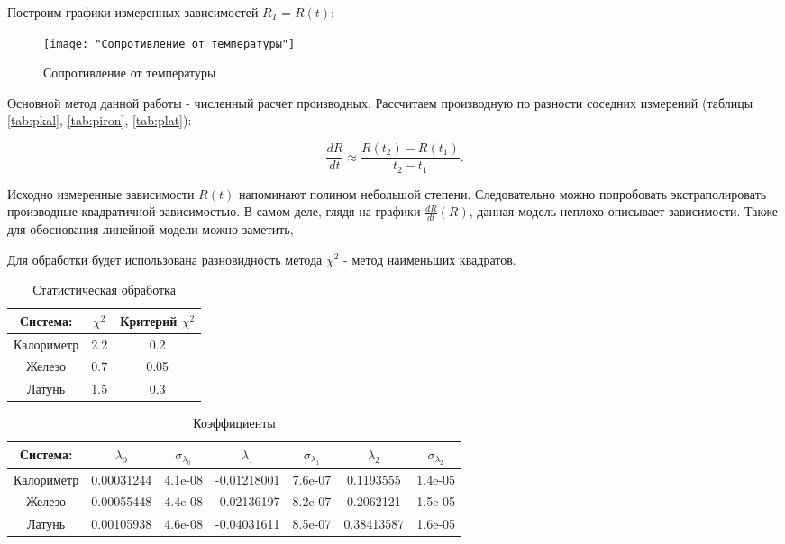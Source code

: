 \documentclass[12pt,a4paper]{article}
\begin{document}
Построим графики измеренных зависимостей $R_T = R(t)$:  
\begin{figure}
	\centering
	\texttt{[image: "Сопротивление от температуры"]}
	\caption{Сопротивление от температуры}
	\label{fig:RotT}
\end{figure}


Основной метод данной работы - численный расчет производных. Рассчитаем производную по разности соседних измерений (таблицы \ref{tab:pkal}, \ref{tab:piron}, \ref{tab:plat}):

$$\frac{dR}{dt} \approx \frac{R(t_2) - R(t_1)}{t_2-t_1}.$$

Исходно измеренные зависимости $R(t)$ напоминают полином небольшой степени. Следовательно можно попробовать экстраполировать производные квадратичной зависимостью. В самом деле, глядя на графики $\frac{dR}{dt}(R)$, данная модель неплохо описывает зависимости.
Также для обоснования линейной модели можно заметить, 

Для обработки будет использована разновидность метода $\chi^2$ - метод наименьших квадратов.


 
\begin{table}
	\centering
	\caption{Статистическая обработка}
	\label{tab:stat}
	\footnotesize
	\begin{tabular}{|c|c|c|}
		
		\hline
		Система: & $\chi^2$ & Критерий $\chi^2$ \\ \hline
		Калориметр & 2.2 & 0.2  \\ \hline
		Железо 	   & 0.7 & 0.05  \\ \hline
		Латунь 	   & 1.5 & 0.3   \\ \hline
		
	\end{tabular}
	
\end{table} 

\begin{table}
	\centering
	\caption{Коэффициенты}
	\label{tab:coeff}
	\footnotesize
	\begin{tabular}{|c|c|c|c|c|c|c|}
		
		\hline
		Система: & $\lambda_0$ & $\sigma_{\lambda_0}$ &$\lambda_1$ & $\sigma_{\lambda_1}$ &$\lambda_2$ & $\sigma_{\lambda_2}$ \\ \hline
		Калориметр 	& 0.00031244 & 4.1e-08 & -0.01218001 & 7.6e-07 & 0.1193555 & 1.4e-05\\ \hline
		Железо      & 0.00055448 & 4.4e-08 & -0.02136197 & 8.2e-07 & 0.2062121 & 1.5e-05\\ \hline
		Латунь 	   & 0.00105938 & 4.6e-08 & -0.04031611  & 8.5e-07 & 0.38413587 & 1.6e-05\\ \hline
	\end{tabular}

\end{table} 
 
\end{document}
